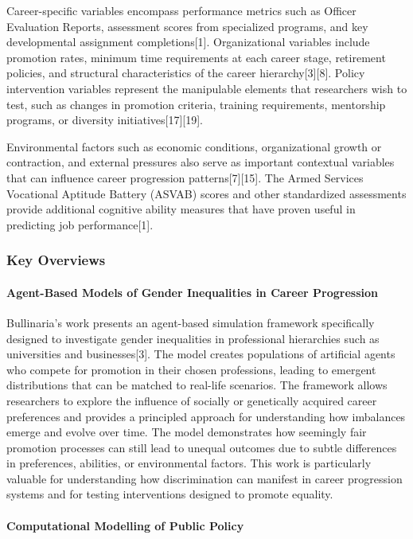 \documentclass[main.tex]{subfiles}
\begin{document}
Career-specific variables encompass performance metrics such as Officer Evaluation Reports, assessment scores from specialized programs, and key developmental assignment completions[1]. Organizational variables include promotion rates, minimum time requirements at each career stage, retirement policies, and structural characteristics of the career hierarchy[3][8]. Policy intervention variables represent the manipulable elements that researchers wish to test, such as changes in promotion criteria, training requirements, mentorship programs, or diversity initiatives[17][19].

Environmental factors such as economic conditions, organizational growth or contraction, and external pressures also serve as important contextual variables that can influence career progression patterns[7][15]. The Armed Services Vocational Aptitude Battery (ASVAB) scores and other standardized assessments provide additional cognitive ability measures that have proven useful in predicting job performance[1].

\subsubsection{Key Overviews}

\paragraph{Agent-Based Models of Gender Inequalities in Career Progression}

Bullinaria's work presents an agent-based simulation framework specifically designed to investigate gender inequalities in professional hierarchies such as universities and businesses[3]. The model creates populations of artificial agents who compete for promotion in their chosen professions, leading to emergent distributions that can be matched to real-life scenarios. The framework allows researchers to explore the influence of socially or genetically acquired career preferences and provides a principled approach for understanding how imbalances emerge and evolve over time. The model demonstrates how seemingly fair promotion processes can still lead to unequal outcomes due to subtle differences in preferences, abilities, or environmental factors. This work is particularly valuable for understanding how discrimination can manifest in career progression systems and for testing interventions designed to promote equality.

\paragraph{Computational Modelling of Public Policy}
\end{document}
